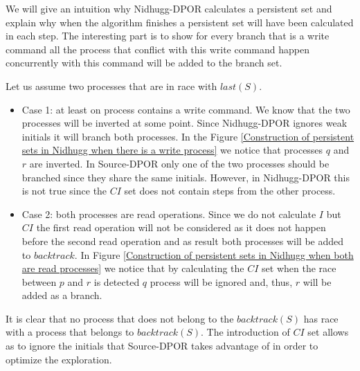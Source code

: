We will give an intuition why Nidhugg-DPOR calculates a persistent set and explain why when the algorithm finishes a persistent set will have been calculated in each step.
The interesting part is to show for every branch that is a write command all the process that conflict with this write command happen concurrently with this
command will be added to the branch set.

Let us assume two processes that are in race with $last(S)$.
\begin{itemize}

\item Case 1: at least on process contains a write command.
We know that the two processes will be inverted at some point. Since Nidhugg-DPOR ignores weak initials it will branch both processes. 
In the Figure \ref{Construction of persistent sets in Nidhugg when there is a write process} we notice that processes $q$ and $r$ are inverted. In Source-DPOR only one of the two processes should be branched since
they share the same initials. However, in Nidhugg-DPOR this is not true since the $CI$ set does not contain steps from the other process.


\item Case 2: both processes are read operations.
Since we do not calculate $I$ but $CI$ the first read operation will not be considered as it does not happen before the second read operation and as result
both processes will be added to $backtrack$. In Figure \ref{Construction of persistent sets in Nidhugg when both are read processes} we notice that by calculating the $CI$ set when the race
between $p$ and $r$ is detected $q$ process will be ignored and, thus, $r$ will be added as a branch.


\end{itemize}

It is clear that no process that does not belong to the $backtrack(S)$ has race with a process that belongs to $backtrack(S)$. The introduction of $CI$ set allows
as to ignore the initials that Source-DPOR takes advantage of in order to optimize the exploration.
